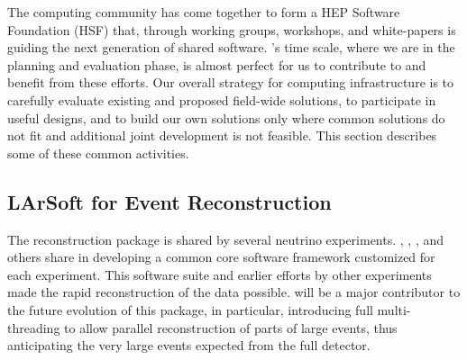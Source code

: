 
\label{ch:exec-comp-gov-coop}

The  computing community has come together to form a HEP Software Foundation (HSF)\cite{Alves:2017she} that, through working groups, workshops, and white-papers is guiding the next generation of shared  software.  's time scale, where we are in the planning and evaluation phase, is almost perfect for us to contribute to and benefit from these efforts.  Our overall strategy for computing infrastructure is to carefully evaluate existing and proposed field-wide solutions, to participate in useful designs, and to build our own solutions only where common solutions do not fit and additional joint development is not feasible.   This section describes some of these common activities. 



\subsection{LArSoft for Event Reconstruction}

The \cite{Snider:2017wjd} reconstruction package is shared by several  neutrino experiments.  , , , and others share in developing a common core software framework customized for each experiment. This software suite and earlier efforts by other experiments made the rapid reconstruction of the  data possible.   will be a major contributor to  the future evolution of this package, in particular, introducing full multi-threading to allow parallel reconstruction of parts of large events, thus anticipating the very large events expected from the full detector. 

